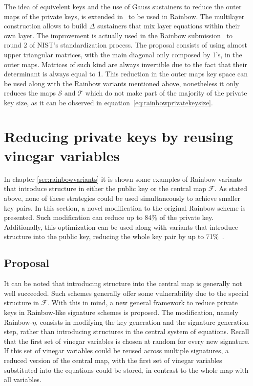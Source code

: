 \documentclass{ufsctex/ufsctex}
\begin{document}
The idea of equivelent keys and the use of Gauss sustainers to reduce the outer
maps of the private keys, is extended in~\cite[Chapter 3.5]{petzoldt2013thesis}
to be used in Rainbow. The multilayer construction allows to build $\Delta$
sustainers that mix layer equations within their own layer. The improvement is
actually used in the Rainbow submission~\cite{ding2019nist} to round 2 of
NIST's standardization process.  The proposal consists of using almost upper
triangular matrices, with the main diagonal only composed by 1's, in the outer
maps. Matrices of such kind are always invertible due to the fact that their
determinant is always equal to 1.  This reduction in the outer maps key space
can be used along with the Rainbow variants mentioned above, nonetheless it
only reduces the maps $\mathcal{S}$ and $\mathcal{T}$ which do not make part of
the majority of the private key size, as it can be observed in
equation~\ref{eq:rainbowprivatekeysize}.

\chapter{Reducing private keys by reusing vinegar variables}

In chapter \ref{sec:rainbowvariants} it is shown some examples of Rainbow
variants that introduce structure in either the public key or the central map
$\mathcal{F}$. As stated above, none of these strategies could be used
simultaneously to achieve smaller key pairs. In this section, a novel
modification to the original Rainbow scheme is presented. Such modification can
reduce up to 84\% of the private key. Additionally, this optimization can be
used along with variants that introduce structure into the public key, reducing
the whole key pair by up to 71\%~\cite{zambonin2019handling}.

\section{Proposal}\label{sec:proposal}

It can be noted that introducing structure into the central map is generally
not well succeeded. Such schemes generally offer some vulnerability due to the
special structure in $\mathcal{F}$. With this in mind, a new general framework
to reduce private keys in Rainbow-like signature schemes is proposed. The
modification, namely Rainbow-$\eta$, consists in modifying the key generation
and the signature generation step, rather than introducing structures in the
central system of equations. Recall that the first set of vinegar variables is
chosen at random for every new signature. If this set of vinegar variables
could be reused across multiple signatures, a reduced version of the central
map, with the first set of vinegar variables substituted into the equations
could be stored, in contrast to the whole map with all variables.
\end{document}
